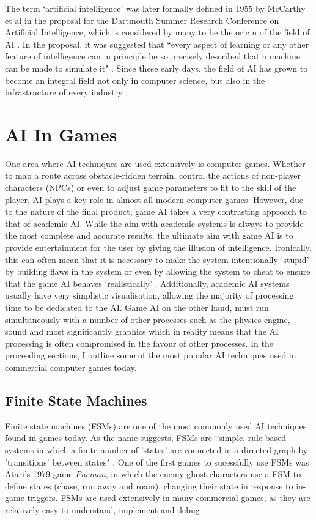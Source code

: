 \documentclass[a4paper,oneside]{report}
\begin{document}
The term `artificial intelligence' was later formally defined in 1955 by McCarthy et al in the proposal for the Dartmouth Summer Research Conference on Artificial Intelligence, which is considered by many to be the origin of the field of AI \cite{Crevier:1993kl}. In the proposal, it was suggested that ``every aspect of learning or any other feature of intelligence can in principle be so precisely described that a machine can be made to simulate it" \cite{McCarthy:1955ve}. Since these early days, the field of AI has grown to become an integral field not only in computer science, but also in the infrastructure of every industry \cite{Kurzweil:2005ly}. 

\section{AI In Games}

One area where AI techniques are used extensively is computer games. Whether to map a route across obstacle-ridden terrain, control the actions of non-player characters (NPCs) or even to adjust game parameters to fit to the skill of the player, AI plays a key role in almost all modern computer games. However, due to the nature of the final product, game AI takes a very contrasting approach to that of academic AI. While the aim with academic systems is always to provide the most complete and accurate results, the ultimate aim with game AI is to provide entertainment for the user by giving the illusion of intelligence. Ironically, this can often mean that it is necessary to make the system intentionally `stupid' by building flaws in the system or even by allowing the system to cheat to ensure that the game AI behaves `realistically' \cite{Liden:2004fk}. Additionally, academic AI systems usually have very simplistic visualisation, allowing the majority of processing time to be dedicated to the AI. Game AI on the other hand, must run simultaneously with a number of other processes such as the physics engine, sound and most significantly graphics which in reality means that the AI processing is often compromised in the favour of other processes. In the proceeding sections, I outline some of the most popular AI techniques used in commercial computer games today.

\subsection{Finite State Machines} 

Finite state machines (FSMs) are one of the most commonly used AI techniques found in games today. As the name suggests, FSMs are ``simple, rule-based systems in which a finite number of 'states' are connected in a directed graph by 'transitions' between states" \cite{:hc}. One of the first games to sucessfully use FSMs was Atari's 1979 game \emph{Pacman}, in which the enemy ghost characters use a FSM to define states (chase, run away and roam), changing their state in response to in-game triggers. FSMs are used extensively in many commercial games, as they are relatively easy to understand, implement and debug \cite{Bourg:2004tg}.
\end{document}
